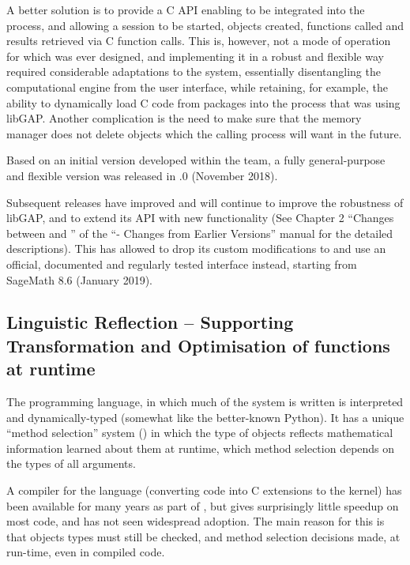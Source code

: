 A better solution is to provide a C API enabling \GAP to be integrated
into the \Sage process, and allowing a \GAP session to be started,
objects created, functions called and results retrieved via C function
calls. This is, however, not a mode of operation for which \GAP was
ever designed, and implementing it in a robust and flexible way
required considerable adaptations to the system, essentially
disentangling the computational engine from the user interface, while retaining,
for example, the ability to dynamically load C code from \GAP
packages into the process that was using libGAP. Another complication
is the need to make sure that the \GAP memory manager does not delete
objects which the calling process will want in the future.

Based on an initial version developed within the \Sage team, a fully
general-purpose and flexible version was released in .0
(November 2018).

Subsequent releases have improved and will continue to improve the
robustness of libGAP, and to extend its API with new functionality (See Chapter 2 
``Changes between  and '' of the 
``\GAP - Changes from Earlier Versions'' manual for the detailed
descriptions). This has allowed \Sage to drop its custom 
modifications to \GAP and use an official, documented and regularly 
tested \GAP interface instead, starting from SageMath 8.6 (January
2019).


\subsection{Linguistic Reflection -- Supporting Transformation and
  Optimisation of \GAP functions at runtime}\label{syntaxtree}
The \GAP programming language, in which much of the system is written
is interpreted and dynamically-typed (somewhat like the better-known
Python). It has a unique ``method selection'' system
(\cite{BreuerLinton98}) in which the type of objects reflects
mathematical information learned about them at runtime, which method
selection depends on the types of all arguments.

A compiler for the language (converting \GAP code
into C extensions to the \GAP kernel) has been available for many
years as part of \GAP, but gives surprisingly little speedup on most code, and has not
seen widespread adoption. The main reason for this is that objects
types must still be checked, and method selection decisions made, at
run-time, even in compiled code.

